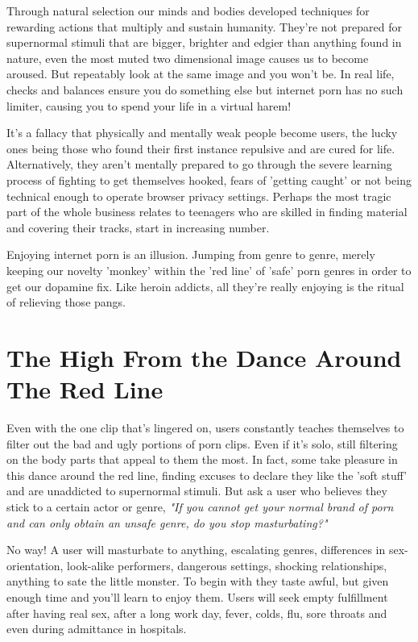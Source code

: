 \documentclass[easypeasy.tex]{subfiles}
\begin{document}
Through natural selection our minds and bodies developed techniques for rewarding actions that multiply and sustain humanity. They're not prepared for supernormal stimuli that are bigger, brighter and edgier than anything found in nature, even the most muted two dimensional image causes us to become aroused. But repeatably look at the same image and you won't be. In real life, checks and balances ensure you do something else but internet porn has no such limiter, causing you to spend your life in a virtual harem!

It's a fallacy that physically and mentally weak people become users, the lucky ones being those who found their first instance repulsive and are cured for life. Alternatively, they aren't mentally prepared to go through the severe learning process of fighting to get themselves hooked, fears of 'getting caught' or not being technical enough to operate browser privacy settings. Perhaps the most tragic part of the whole business relates to teenagers who are skilled in finding material and covering their tracks, start in increasing number.

Enjoying internet porn is an illusion. Jumping from genre to genre, merely keeping our novelty 'monkey' within the 'red line' of 'safe' porn genres in order to get our dopamine fix. Like heroin addicts, all they're really enjoying is the ritual of relieving those pangs.

\section{The High From the Dance Around The Red Line}
Even with the one clip that's lingered on, users constantly teaches themselves to filter out the bad and ugly portions of porn clips. Even if it's solo, still filtering on the body parts that appeal to them the most. In fact, some take pleasure in this dance around the red line, finding excuses to declare they like the 'soft stuff' and are unaddicted to supernormal stimuli. But ask a user who believes they stick to a certain actor or genre, \textit{"If you cannot get your normal brand of porn and can only obtain an unsafe genre, do you stop masturbating?"}

No way! A user will masturbate to anything, escalating genres, differences in sex-orientation, look-alike performers, dangerous settings, shocking relationships, anything to sate the little monster. To begin with they taste awful, but given enough time and you'll learn to enjoy them. Users will seek empty fulfillment after having real sex, after a long work day, fever, colds, flu, sore throats and even during admittance in hospitals.
\end{document}

